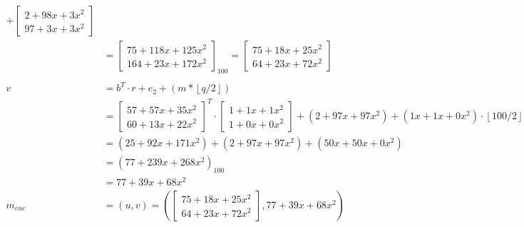 \begin{align*}
  +
  \begin{bmatrix}2+98x+3x^2 \\ 97+3x+3x^2 \end{bmatrix}                                                 \\
          & = \begin{bmatrix}75+118x+125x^2 \\ 164+23x+172x^2 \end{bmatrix}_{100}
  = 
  \begin{bmatrix}75+18x+25x^2 \\ 64+23x+72x^2 \end{bmatrix}                                             \\
  \\
  v       & = b^T \cdot r + e_2 + (m*\left\lfloor q/2\right\rfloor)                                     \\
          & =\begin{bmatrix}
               57+57x+35x^2 \\
               60+13x+22x^2
             \end{bmatrix} ^T
  \cdot
  \begin{bmatrix}1+1x+1x^2 \\ 1+0x+0x^2 \end{bmatrix}
  + (2+97x+97x^2) + (1x+1x+0x^2) \cdot \left\lfloor 100/2\right\rfloor                                  \\
          & = (25+92x+171x^2) + (2+97x+97x^2) + (50x+50x+0x^2)                                          \\
          & = (77+239x+268x^2)_{100}                                                                    \\
          & = 77+39x+68x^2                                                                              \\
  m_{enc} & = (u, v) = \left (
  \begin{bmatrix}75+18x+25x^2 \\ 64+23x+72x^2 \end{bmatrix}, 77+39x+68x^2   \right )                    \\
\end{align*}

